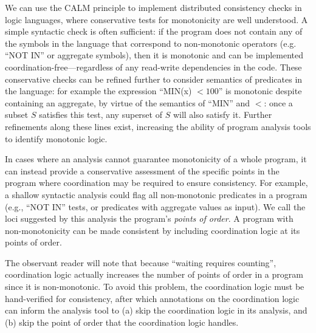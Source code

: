 We can use the CALM principle to implement distributed consistency checks in logic languages, where conservative tests for monotonicity are well understood. A simple syntactic check is often sufficient: if the program does not contain any of the symbols in the language that correspond to non-monotonic operators (e.g. ``NOT IN'' or aggregate symbols), then it is monotonic and can be implemented coordination-free---regardless of any read-write dependencies in the code.  These conservative checks can be refined further to consider semantics of predicates in the language: for example the expression ``MIN(x) $< 100$'' is monotonic despite containing an aggregate, by virtue of the semantics of ``MIN'' and $<$: once a subset $S$ satisfies this test, any superset of $S$ will also satisfy it.  Further refinements along these lines exist, increasing the ability of program analysis tools to identify monotonic logic.
% 

In cases where an analysis cannot guarantee monotonicity of a whole program, it can instead provide a conservative assessment of the specific points in the program where coordination may be required to ensure consistency.  For example, a shallow syntactic analysis could flag all non-monotonic predicates in a program (e.g., ``NOT IN'' tests, or predicates with aggregate values as input).
We call the loci suggested by this analysis the program's \emph{points of
order}. A program with non-monotonicity can be made consistent by including coordination logic at its points of order.  

The observant reader will note that because ``waiting requires counting'', coordination logic actually increases the number of points of order in a program since it is non-monotonic.  To avoid this problem, the coordination logic must be hand-verified for consistency, after which annotations on the coordination logic can inform the analysis tool to (a) skip the coordination logic in its analysis, and (b) skip the point of order that the coordination logic handles.  

